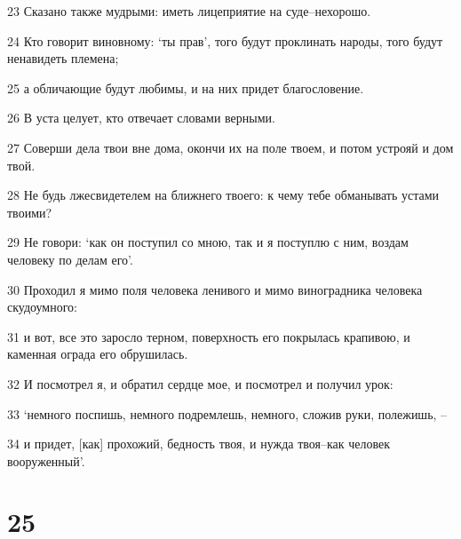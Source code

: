 \par 23 Сказано также мудрыми: иметь лицеприятие на суде--нехорошо.
\par 24 Кто говорит виновному: `ты прав', того будут проклинать народы, того будут ненавидеть племена;
\par 25 а обличающие будут любимы, и на них придет благословение.
\par 26 В уста целует, кто отвечает словами верными.
\par 27 Соверши дела твои вне дома, окончи их на поле твоем, и потом устрояй и дом твой.
\par 28 Не будь лжесвидетелем на ближнего твоего: к чему тебе обманывать устами твоими?
\par 29 Не говори: `как он поступил со мною, так и я поступлю с ним, воздам человеку по делам его'.
\par 30 Проходил я мимо поля человека ленивого и мимо виноградника человека скудоумного:
\par 31 и вот, все это заросло терном, поверхность его покрылась крапивою, и каменная ограда его обрушилась.
\par 32 И посмотрел я, и обратил сердце мое, и посмотрел и получил урок:
\par 33 `немного поспишь, немного подремлешь, немного, сложив руки, полежишь, --
\par 34 и придет, [как] прохожий, бедность твоя, и нужда твоя--как человек вооруженный'.

\chapter{25}

